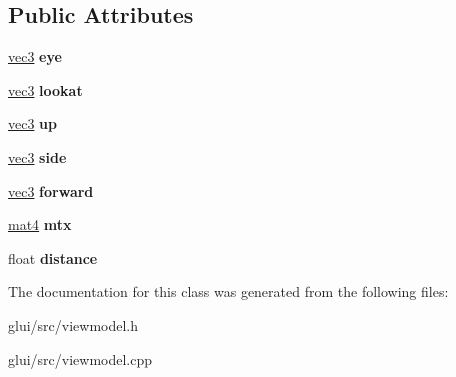 \subsection*{Public Attributes}
\begin{DoxyCompactItemize}
\item 
\hypertarget{classViewModel_a5f8727833374f2d99e4c0f379f5a759e}{\hyperlink{classvec3}{vec3} {\bfseries eye}}\label{classViewModel_a5f8727833374f2d99e4c0f379f5a759e}

\item 
\hypertarget{classViewModel_a45dd187579bb94f2106a13318c1ae279}{\hyperlink{classvec3}{vec3} {\bfseries lookat}}\label{classViewModel_a45dd187579bb94f2106a13318c1ae279}

\item 
\hypertarget{classViewModel_a19c93bd7be24d0cf2359a9b96842a470}{\hyperlink{classvec3}{vec3} {\bfseries up}}\label{classViewModel_a19c93bd7be24d0cf2359a9b96842a470}

\item 
\hypertarget{classViewModel_a37d20e786feb94b5dee7e49d2c88b07c}{\hyperlink{classvec3}{vec3} {\bfseries side}}\label{classViewModel_a37d20e786feb94b5dee7e49d2c88b07c}

\item 
\hypertarget{classViewModel_a6fcbd635a72b202a1b01188b242c388e}{\hyperlink{classvec3}{vec3} {\bfseries forward}}\label{classViewModel_a6fcbd635a72b202a1b01188b242c388e}

\item 
\hypertarget{classViewModel_a3e6f4972330079fc345e917066f5cee1}{\hyperlink{classmat4}{mat4} {\bfseries mtx}}\label{classViewModel_a3e6f4972330079fc345e917066f5cee1}

\item 
\hypertarget{classViewModel_a3805a6be41e176b4bb9039c51c3a0ee6}{float {\bfseries distance}}\label{classViewModel_a3805a6be41e176b4bb9039c51c3a0ee6}

\end{DoxyCompactItemize}


The documentation for this class was generated from the following files\-:\begin{DoxyCompactItemize}
\item 
glui/src/viewmodel.\-h\item 
glui/src/viewmodel.\-cpp\end{DoxyCompactItemize}
